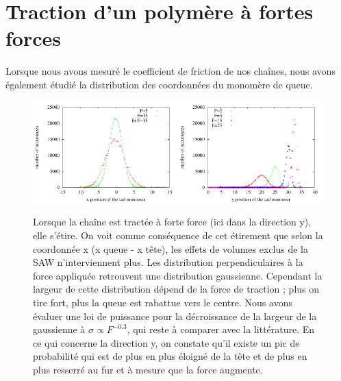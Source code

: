 \documentclass[a4paper,11pt]{article}
\begin{document}
\newpage

\section*{Traction d'un polymère à fortes forces}

Lorsque nous avons mesuré le coefficient de friction de nos chaînes, nous avons également étudié la distribution des coordonnées du monomère de queue.

\begin{figure}[H]
\begin{center}
\includegraphics[width=0.5\textwidth]{gausslateral.pdf}\includegraphics[width=0.5\textwidth]{ydistribtraction.pdf}

\caption{Lorsque la chaîne est tractée à forte force (ici dans la direction y), elle s'étire. On voit comme conséquence de cet étirement que selon la coordonnée x (x queue - x tête),  les effets de volumes exclus de la SAW n'interviennent plus. Les distribution perpendiculaires à la force appliquée retrouvent une distribution gaussienne. Cependant la largeur de cette distribution dépend de la force de traction ; plus on tire fort, plus la queue est rabattue vers le centre. Nous avons évaluer une loi de puissance pour la décroissance de la largeur de la gaussienne à $\sigma \propto F^{-0.3}$, qui reste à comparer avec la littérature. En ce qui concerne la direction y, on constate qu'il existe un pic de probabilité qui est de plus en plus éloigné de la tête et de plus en plus resserré au fur et à mesure que la force augmente. }
\label{traction}
\end{center}
\end{figure}
\end{document}

